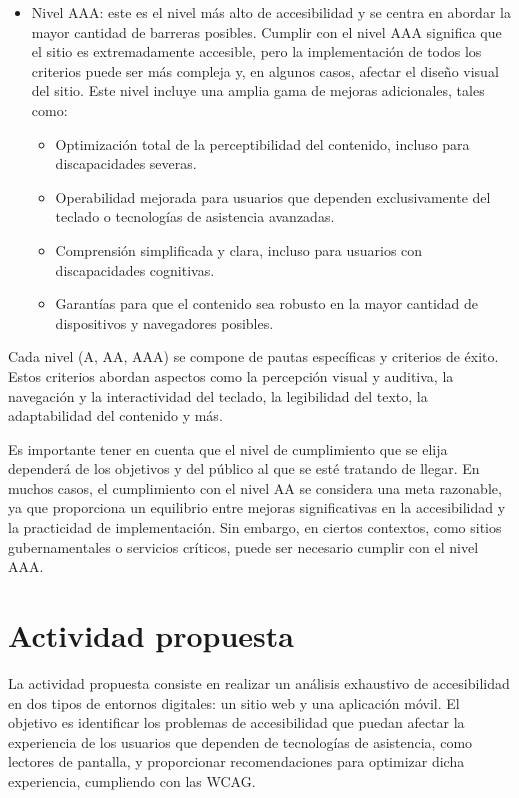 \documentclass[]{article}
\begin{document}
\begin{itemize}
	\item Nivel AAA: este es el nivel más alto de accesibilidad y se centra en abordar la mayor cantidad de barreras posibles. Cumplir con el nivel AAA significa que el sitio es extremadamente accesible, pero la implementación de todos los criterios puede ser más compleja y, en algunos casos, afectar el diseño visual del sitio. Este nivel incluye una amplia gama de mejoras adicionales, tales como:
	\begin{itemize}
		\item Optimización total de la perceptibilidad del contenido, incluso para discapacidades severas.
		\item Operabilidad mejorada para usuarios que dependen exclusivamente del teclado o tecnologías de asistencia avanzadas.
		\item Comprensión simplificada y clara, incluso para usuarios con discapacidades cognitivas.
		\item Garantías para que el contenido sea robusto en la mayor cantidad de dispositivos y navegadores posibles.
	\end{itemize}
\end{itemize}

Cada nivel (A, AA, AAA) se compone de pautas específicas y criterios de éxito. Estos criterios abordan aspectos como la percepción visual y auditiva, la navegación y la interactividad del teclado, la legibilidad del texto, la adaptabilidad del contenido y más. 

Es importante tener en cuenta que el nivel de cumplimiento que se elija dependerá de los objetivos y del público al que se esté tratando de llegar. En muchos casos, el cumplimiento con el nivel AA se considera una meta razonable, ya que proporciona un equilibrio entre mejoras significativas en la accesibilidad y la practicidad de implementación. Sin embargo, en ciertos contextos, como sitios gubernamentales o servicios críticos, puede ser necesario cumplir con el nivel AAA.

\newpage

\section{Actividad propuesta}

La actividad propuesta consiste en realizar un análisis exhaustivo de accesibilidad en dos tipos de entornos digitales: un sitio web y una aplicación móvil. El objetivo es identificar los problemas de accesibilidad que puedan afectar la experiencia de los usuarios que dependen de tecnologías de asistencia, como lectores de pantalla, y proporcionar recomendaciones para optimizar dicha experiencia, cumpliendo con las WCAG. 
\end{document}
